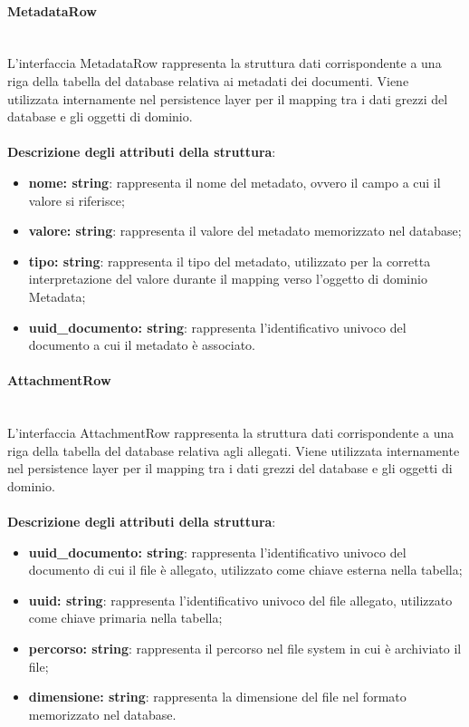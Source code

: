 \documentclass[a4paper,12pt]{article}
\begin{document}
                \paragraph{MetadataRow}\label{par:MetadataRow}\mbox{}\\
                L'interfaccia MetadataRow rappresenta la struttura dati corrispondente a una riga della tabella del database relativa ai metadati dei documenti. Viene utilizzata internamente nel persistence layer per il mapping tra i dati grezzi del database e gli oggetti di dominio.\\
                \\
                \textbf{Descrizione degli attributi della struttura}:
                \begin{itemize}
                    \item \textbf{nome: string}: rappresenta il nome del metadato, ovvero il campo a cui il valore si riferisce;
                    \item \textbf{valore: string}: rappresenta il valore del metadato memorizzato nel database;
                    \item \textbf{tipo: string}: rappresenta il tipo del metadato, utilizzato per la corretta interpretazione del valore durante il mapping verso l'oggetto di dominio Metadata;
                    \item \textbf{uuid\_documento: string}: rappresenta l'identificativo univoco del documento a cui il metadato è associato.
                \end{itemize}
 
                \paragraph{AttachmentRow}\label{par:AttachmentRow}\mbox{}\\
                L'interfaccia AttachmentRow rappresenta la struttura dati corrispondente a una riga della tabella del database relativa agli allegati. Viene utilizzata internamente nel persistence layer per il mapping tra i dati grezzi del database e gli oggetti di dominio.\\
                \\
                \textbf{Descrizione degli attributi della struttura}:
                \begin{itemize}
                    \item \textbf{uuid\_documento: string}: rappresenta l'identificativo univoco del documento di cui il file è allegato, utilizzato come chiave esterna nella tabella;
                    \item \textbf{uuid: string}: rappresenta l'identificativo univoco del file allegato, utilizzato come chiave primaria nella tabella;
                    \item \textbf{percorso: string}: rappresenta il percorso nel file system in cui è archiviato il file;
                    \item \textbf{dimensione: string}: rappresenta la dimensione del file nel formato memorizzato nel database.
                \end{itemize}
 
\end{document}
